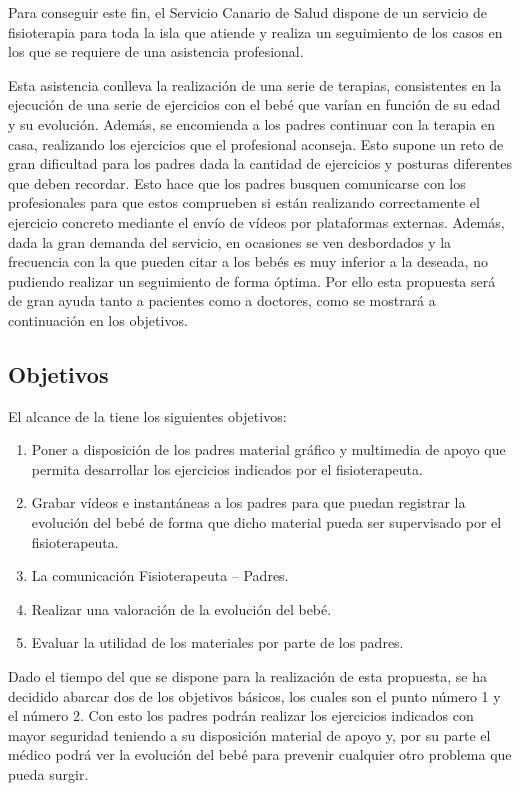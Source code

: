 Para conseguir este fin, el Servicio Canario de Salud dispone de un servicio de fisioterapia
para toda la isla que atiende y realiza un seguimiento de los casos en los que se requiere de
una asistencia profesional.

Esta asistencia conlleva la realización de una serie de terapias, consistentes en
la ejecución de una serie de ejercicios con el bebé que varían en función de su edad y su
evolución. Además, se encomienda a los padres continuar con la terapia en casa, realizando
los ejercicios que el profesional aconseja. Esto supone un reto de gran dificultad para los
padres dada la cantidad de ejercicios y posturas diferentes que deben recordar. Esto hace que
los padres busquen comunicarse con los profesionales para que estos comprueben si están
realizando correctamente el ejercicio concreto mediante el envío de vídeos por plataformas
externas. Además, dada la gran demanda del servicio, en ocasiones se ven desbordados y la
frecuencia con la que pueden citar a los bebés es muy inferior a la deseada, no pudiendo
realizar un seguimiento de forma óptima. Por ello esta propuesta será de gran ayuda tanto
a pacientes como a doctores, como se mostrará a continuación en los objetivos.

\bigskip
\subsection{Objetivos}
El alcance de la \textbf{\myTitle} tiene los siguientes objetivos:
\begin{enumerate}
    \item Poner a disposición de los padres material gráfico y multimedia de apoyo que permita desarrollar los ejercicios indicados por el fisioterapeuta.
    \item Grabar vídeos e instantáneas a los padres para que puedan registrar la evolución del bebé de forma que dicho material pueda ser supervisado por el fisioterapeuta.
    \item La comunicación Fisioterapeuta – Padres.
    \item Realizar una valoración de la evolución del bebé.
    \item Evaluar la utilidad de los materiales por parte de los padres.
\end{enumerate}

Dado el tiempo del que se dispone para la realización de esta propuesta, se ha decidido abarcar
dos de los objetivos básicos, los cuales son el punto número 1 y el número 2. Con esto los padres
podrán realizar los ejercicios indicados con mayor seguridad teniendo a su disposición material
de apoyo y, por su parte el médico podrá ver la evolución del bebé para prevenir cualquier otro
problema que pueda surgir.